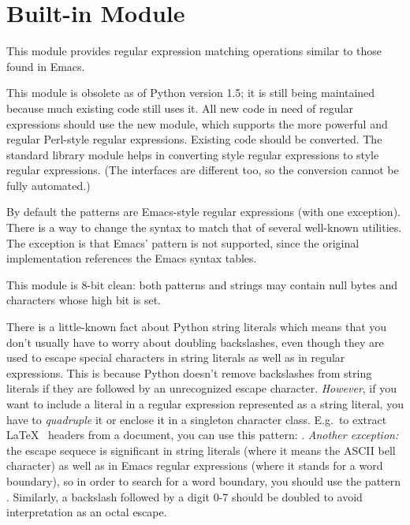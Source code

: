 \section{Built-in Module }
\label{module-regex}

This module provides regular expression matching operations similar to
those found in Emacs.

This module is obsolete as of Python version 1.5; it is still being
maintained because much existing code still uses it.  All new code in
need of regular expressions should use the new  module, which
supports the more powerful and regular Perl-style regular expressions.
Existing code should be converted.  The standard library module
 helps in converting  style regular
expressions to  style regular expressions.  (The interfaces
are different too, so the conversion cannot be fully automated.)

By default the patterns are Emacs-style regular expressions
(with one exception).  There is
a way to change the syntax to match that of several well-known
\UNIX{} utilities.  The exception is that Emacs' 
pattern is not supported, since the original implementation references
the Emacs syntax tables.

This module is 8-bit clean: both patterns and strings may contain null
bytes and characters whose high bit is set.

 There is a little-known fact about Python string
literals which means that you don't usually have to worry about
doubling backslashes, even though they are used to escape special
characters in string literals as well as in regular expressions.  This
is because Python doesn't remove backslashes from string literals if
they are followed by an unrecognized escape character.
\emph{However}, if you want to include a literal  in a
regular expression represented as a string literal, you have to
\emph{quadruple} it or enclose it in a singleton character class.
E.g.\  to extract \LaTeX\  headers from a document, you can use this pattern:
.  \emph{Another exception:}
the escape sequece  is significant in string literals
(where it means the ASCII bell character) as well as in Emacs regular
expressions (where it stands for a word boundary), so in order to
search for a word boundary, you should use the pattern .
Similarly, a backslash followed by a digit 0-7 should be doubled to
avoid interpretation as an octal escape.

